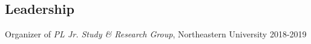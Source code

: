 \documentclass[margin,line]{resume}
\begin{document}
\begin{resume}
   
    \section{\mysidestyle Leadership} 
     Organizer of \emph{PL Jr. Study \& Research Group}, Northeastern University \hfill 2018-2019

    \newpage




\end{resume}
\end{document}
